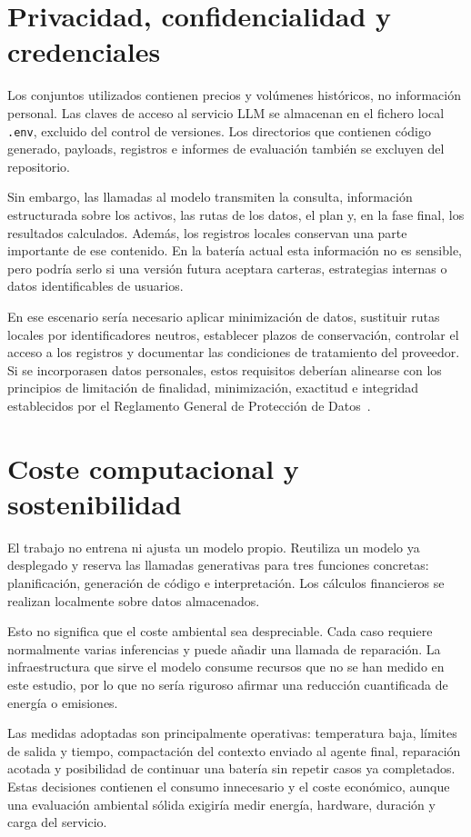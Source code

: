 \section{Privacidad, confidencialidad y credenciales}

Los conjuntos utilizados contienen precios y volúmenes históricos, no información personal. Las claves de acceso al servicio LLM se almacenan en el fichero local \texttt{.env}, excluido del control de versiones. Los directorios que contienen código generado, payloads, registros e informes de evaluación también se excluyen del repositorio.

Sin embargo, las llamadas al modelo transmiten la consulta, información estructurada sobre los activos, las rutas de los datos, el plan y, en la fase final, los resultados calculados. Además, los registros locales conservan una parte importante de ese contenido. En la batería actual esta información no es sensible, pero podría serlo si una versión futura aceptara carteras, estrategias internas o datos identificables de usuarios.

En ese escenario sería necesario aplicar minimización de datos, sustituir rutas locales por identificadores neutros, establecer plazos de conservación, controlar el acceso a los registros y documentar las condiciones de tratamiento del proveedor. Si se incorporasen datos personales, estos requisitos deberían alinearse con los principios de limitación de finalidad, minimización, exactitud e integridad establecidos por el Reglamento General de Protección de Datos~\cite{gdpr2016}.

\section{Coste computacional y sostenibilidad}

El trabajo no entrena ni ajusta un modelo propio. Reutiliza un modelo ya desplegado y reserva las llamadas generativas para tres funciones concretas: planificación, generación de código e interpretación. Los cálculos financieros se realizan localmente sobre datos almacenados.

Esto no significa que el coste ambiental sea despreciable. Cada caso requiere normalmente varias inferencias y puede añadir una llamada de reparación. La infraestructura que sirve el modelo consume recursos que no se han medido en este estudio, por lo que no sería riguroso afirmar una reducción cuantificada de energía o emisiones.

Las medidas adoptadas son principalmente operativas: temperatura baja, límites de salida y tiempo, compactación del contexto enviado al agente final, reparación acotada y posibilidad de continuar una batería sin repetir casos ya completados. Estas decisiones contienen el consumo innecesario y el coste económico, aunque una evaluación ambiental sólida exigiría medir energía, hardware, duración y carga del servicio.

